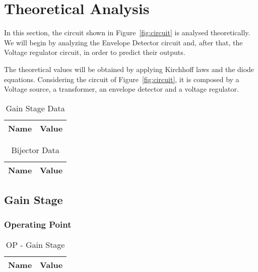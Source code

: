 \section{Theoretical Analysis}
\label{sec:analysis}
In this section, the circuit shown in Figure~\ref{fig:circuit} is analysed
theoretically. We will begin by analyzing the Envelope Detector circuit and, after that, the Voltage regulator circuit, in order to predict their outputs.

The theoretical values will be obtained by applying Kirchhoff laws and the diode equations.
Considering the circuit of Figure~\ref{fig:circuit}, it is composed by a Voltage source, a transformer, an envelope detector and a voltage regulator.

\begin{table}[H]
  \centering
  \begin{tabular}{|l|r|}
     \hline    
    {\bf Name} & {\bf Value} \\ \hline   
    
  \end{tabular}
  \caption{Gain Stage Data}
  \label{tab:datags}
\end{table}

\begin{table}[H]
  \centering
  \begin{tabular}{|l|r|}
     \hline    
    {\bf Name} & {\bf Value} \\ \hline   
    
  \end{tabular}
  \caption{Bijector Data}
  \label{tab:bgs}
\end{table}

\subsection{Gain Stage}

\subsubsection{Operating Point}

\begin{table}[H]
  \centering
  \begin{tabular}{|l|r|}
     \hline    
    {\bf Name} & {\bf Value} \\ \hline   
    
  \end{tabular}
  \caption{OP - Gain Stage}
  \label{tab:opgs}
\end{table}
